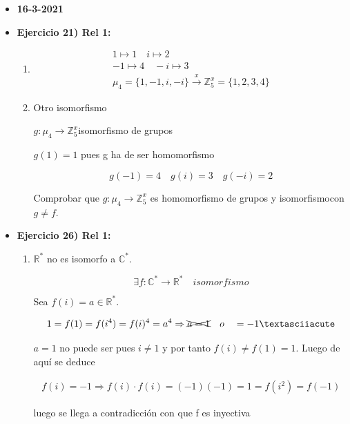 \documentclass{article}
\begin{document}
\begin{itemize}
\item \textbf{16-3-2021}

\item \textbf{Ejercicio 21) Rel 1:} 

\begin{enumerate}[1)]
\item
\begin{gather*}
1 \mapsto 1 \quad i\mapsto 2 \\
-1 \mapsto 4 \quad -i\mapsto 3 \\
\mu_4=\{1,-1,i,-i\}\xrightarrow{x}\mathbb{Z}_5^x=\{1,2,3,4\}
\end{gather*}

\item Otro isomorfismo

$g:\mu_4 \rightarrow \mathbb{Z}_5^x $isomorfismo de grupos

$g(1)=1$ pues g ha de ser homomorfismo 

\begin{equation*}
g(-1)=4 \quad g(i)=3 \quad g(-i)=2 
\end{equation*}

Comprobar que $g:\mu_4\rightarrow \mathbb{Z}_5^x$ es homomorfismo de grupos y isomorfismocon $g \neq f$.
\end{enumerate}

\item \textbf{Ejercicio 26) Rel 1:} 

\begin{enumerate}[1)]
\item $\mathbb{R}^*$ no es isomorfo a $\mathbb{C}^*$.

\begin{equation*}
\exists f:\mathbb{C}^*\rightarrow \mathbb{R}^* \quad isomorfismo
\end{equation*}

Sea $f(i)=a\in \mathbb{R}^*$.

\begin{gather*}
1=f(1)=f(i^4)=f(i)^4=a^4 \Rightarrow \xcancel{a = 1}\quad o\quad =-1´
\end{gather*}

$a=1$ no puede ser pues $i\neq 1$ y por tanto $f(i)\neq f(1)=1$. Luego de aquí se deduce
\

\begin{gather*}
f(i)=-1 \Rightarrow f(i)\cdot f(i)=(-1)(-1)=1=f(i^2)=f(-1)
\end{gather*}

luego se llega a contradicción con que f es inyectiva


\end{enumerate}
\end{itemize}
\end{document}
